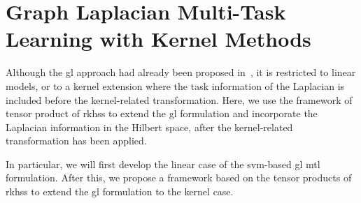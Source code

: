 \section{Graph Laplacian Multi-Task Learning with Kernel Methods}\label{sec:graphlap}

Although the \acrshort{gl} approach had already been proposed in~\citet{EvgeniouMP05}, it is restricted to linear models, or to a kernel extension where the task information of the Laplacian is included before the kernel-related transformation.
Here, we use the framework of tensor product of \acrshort{rkhss} to extend the \acrshort{gl} formulation and incorporate the Laplacian information in the Hilbert space, after the kernel-related transformation has been applied.

In particular, we will first develop the linear case of the \acrshort{svm}-based \acrshort{gl} \acrshort{mtl} formulation. After this, we propose a framework based on the tensor products of \acrshort{rkhss} to extend the \acrshort{gl} formulation to the kernel case.

